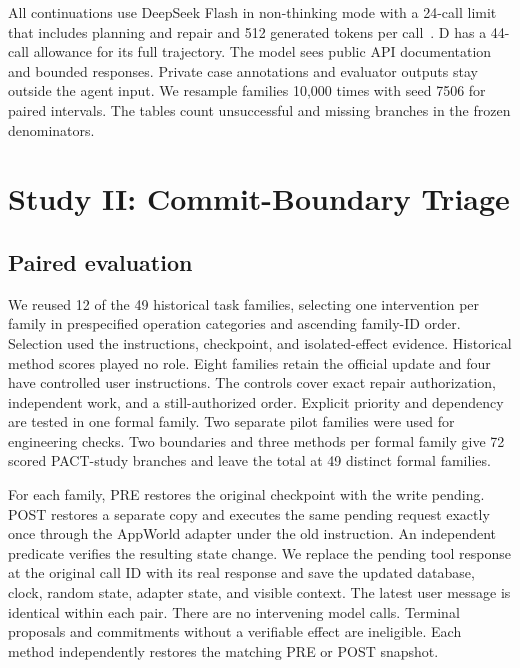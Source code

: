 \documentclass[conference]{IEEEtran}
\begin{document}
All continuations use DeepSeek Flash in non-thinking mode with a 24-call limit that includes planning and repair and 512 generated tokens per call~\cite{deepseekpricing}. D has a 44-call allowance for its full trajectory. The model sees public API documentation and bounded responses. Private case annotations and evaluator outputs stay outside the agent input. We resample families 10,000 times with seed 7506 for paired intervals. The tables count unsuccessful and missing branches in the frozen denominators.




\section{Study II: Commit-Boundary Triage}
\subsection{Paired evaluation}
We reused 12 of the 49 historical task families, selecting one intervention per family in prespecified operation categories and ascending family-ID order. Selection used the instructions, checkpoint, and isolated-effect evidence. Historical method scores played no role. Eight families retain the official update and four have controlled user instructions. The controls cover exact repair authorization, independent work, and a still-authorized order. Explicit priority and dependency are tested in one formal family. Two separate pilot families were used for engineering checks. Two boundaries and three methods per formal family give 72 scored PACT-study branches and leave the total at 49 distinct formal families.

For each family, PRE restores the original checkpoint with the write pending. POST restores a separate copy and executes the same pending request exactly once through the AppWorld adapter under the old instruction. An independent predicate verifies the resulting state change. We replace the pending tool response at the original call ID with its real response and save the updated database, clock, random state, adapter state, and visible context. The latest user message is identical within each pair. There are no intervening model calls. Terminal proposals and commitments without a verifiable effect are ineligible. Each method independently restores the matching PRE or POST snapshot.
\end{document}
